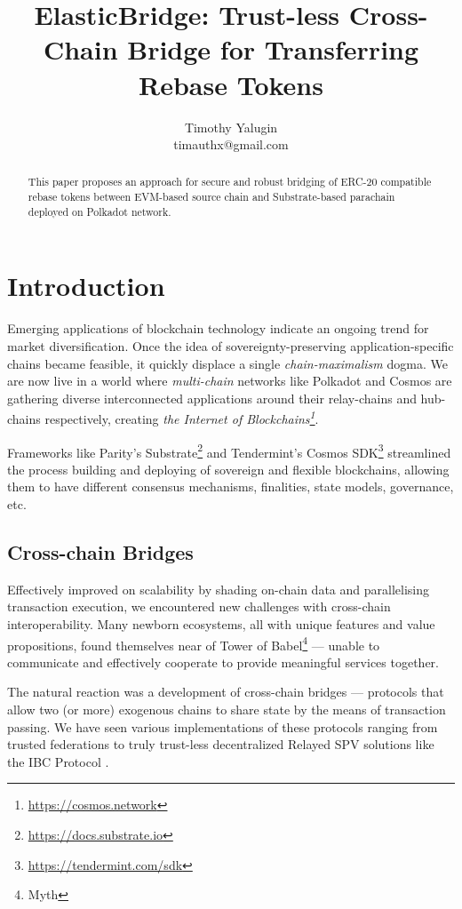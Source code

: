 \documentclass{article}
\title{ElasticBridge: Trust-less Cross-Chain Bridge for Transferring Rebase Tokens}
\author{Timothy Yalugin\\timauthx@gmail.com}
\begin{document}
\maketitle

\begin{abstract}

This paper proposes an approach for secure and robust bridging of ERC-20 compatible rebase tokens between EVM-based source chain and Substrate-based parachain deployed on Polkadot network.

\end{abstract}

\section{Introduction}

Emerging applications of blockchain technology indicate an ongoing trend for market diversification. Once the idea of sovereignty-preserving application-specific chains became feasible, it quickly displace a single \textit{chain-maximalism} dogma. We are now live in a world where \textit{multi-chain} networks like Polkadot \cite{wood2016polkadot} and Cosmos \cite{kwon2016cosmos} are gathering diverse interconnected applications around their relay-chains and hub-chains respectively, creating \textit{the Internet of Blockchains\footnote{\url{https://cosmos.network}}}.

Frameworks like Parity's Substrate\footnote{\url{https://docs.substrate.io}} and Tendermint's Cosmos SDK\footnote{\url{https://tendermint.com/sdk}} streamlined the process building and deploying of sovereign and flexible blockchains, allowing them to have different consensus mechanisms, finalities, state models, governance, etc.

\subsection{Cross-chain Bridges}

Effectively improved on scalability by shading on-chain data and parallelising transaction execution, we encountered new challenges with cross-chain interoperability. Many newborn ecosystems, all with unique features and value propositions, found themselves near of Tower of Babel\footnote{Myth} --- unable to communicate and effectively cooperate to provide meaningful services together.

The natural reaction was a development of cross-chain bridges --- protocols that allow two (or more) exogenous chains to share state by the means of transaction passing. We have seen various implementations of these protocols ranging from trusted federations to truly trust-less decentralized Relayed SPV solutions like the IBC Protocol \cite{goes2020ibc}.
\end{document}
